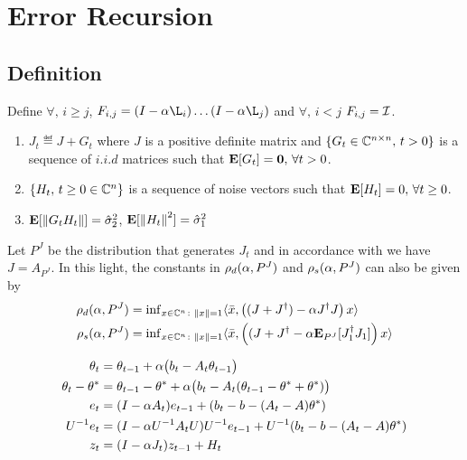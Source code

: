 \section{Error Recursion}
\subsection{Definition}
\begin{definition}
Define $\forall,\,i\geq j$, $F_{i,j}=(I-\alpha \L_i)\ldots (I-\alpha \L_j)$ and $\forall,\,i<j$ $F_{i,j}=\mathcal{I}$.
\end{definition}

\begin{assumption}\label{cmplxassmp}
\begin{enumerate}[leftmargin=*, before=\leavevmode\vspace{-\baselineskip}]
\item $J_t\eqdef J + G_t$ where $J$ is a positive definite matrix and $\{G_t \in \mathbb{C}^{n\times n},\,t> 0\}$ is a sequence of $i.i.d$ matrices such that $\mathbf{E}[G_t]=\mathbf{0},\,\forall t>0$.
\item $\{H_t,\,t\geq 0\in \mathbb{C}^n\}$ is a sequence of noise vectors such that $\mathbf{E}[H_t]=0,\,\forall t\geq 0$.
\item $\mathbf{E}[\left\| G_t H_t\right\|]=\hat{\sigma}_2^2$, $\mathbf{E}[\left\| H_t\right\|^2]=\hat{\sigma}_1^2$
\end{enumerate}
\end{assumption}
Let $P^J$ be the distribution that generates $J_t$ and in accordance with  we have $J=A_{P^J}$. In this light, the constants in  $\rho_d(\alpha,P^J)$ and $\rho_s(\alpha,P^J)$ can also be given by
\begin{align*}
\rho_d(\alpha,P^J)&={\inf}_{x\in\mathbb{C}^n\colon\left\| x\right\|=1}\langle\bar{x},\left((J+J^\dag)-\alpha J^\dag J\right)x\rangle\\
\rho_s(\alpha,P^J)&={\inf}_{x\in \mathbb{C}^n\colon\left\| x\right\|=1}\langle\bar{x},\left((J+J^\dag-\alpha \mathbf{E}_{P^J}[J_1^\dag J_1]\right)x\rangle
\end{align*}



\begin{align}
\theta_t&=\theta_{t-1}+\alpha\big(b_t-A_t\theta_{t-1}\big)\\
\theta_t-\theta^*&=\theta_{t-1}-\theta^*+\alpha\big(b_t-A_t(\theta_{t-1}-\theta^*+\theta^*)\big)\\
e_t&=(I-\alpha A_t)e_{t-1}+(b_t -b -(A_t-A)\theta^*)\\
U^{-1}e_t&=(I-\alpha U^{-1}A_t U) U^{-1}e_{t-1}+ U^{-1}(b_t -b -(A_t-A)\theta^*)\\
z_t&=(I-\alpha J_t) z_{t-1}+ H_t
\end{align}


